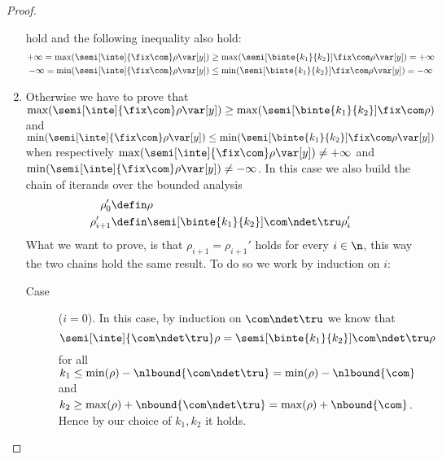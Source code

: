 \begin{proof}
\begin{inductive}
\begin{enumerate}[label=(\roman*)]
      hold and the following inequality also hold:
      \begin{align*}
        +\infty = \max({\semi[\inte]{\fix\com}\rho\var[y]}) & \geq \max({\semi[\binte{k_1}{k_2}]{\fix\com}\rho\var[y]}) = +\infty \\
        -\infty = \min({\semi[\inte]{\fix\com}\rho\var[y]}) & \leq \min({\semi[\binte{k_1}{k_2}]{\fix\com}\rho\var[y]}) = -\infty
      \end{align*}
    \item Otherwise we have to prove that
      \({\max(\semi[\inte]{\fix\com}\rho\var[y])} \geq
      {\max(\semi[\binte{k_1}{k_2}]{\fix\com}\rho)}\) and
      \({\min(\semi[\inte]{\fix\com}\rho\var[y])} \leq
      {\min(\semi[\binte{k_1}{k_2}]{\fix\com}\rho\var[y])}\) when
      respectively
      \({\max(\semi[\inte]{\fix\com}\rho\var[y]) \neq + \infty}\) and
      \({\min(\semi[\inte]{\fix\com}\rho\var[y]) \neq -\infty}\). In
      this case we also build the chain of iterands over the bounded
      analysis
      \begin{align*}
        \rho_0'& \defin \rho \\
        \rho_{i+1}' & \defin \semi[\binte{k_1}{k_2}]{\com\ndet\tru}\rho_i'
      \end{align*}
      What we want to prove, is that \(\rho_{i+1} = \rho_{i+1}'\)
      holds for every \(i\in\n\), this way the two chains hold the
      same result. To do so we work by induction on \(i\):
      \begin{description}
      \item[Case] (\(i=0\)). In this case, by induction on
        \(\com\ndet\tru\) we know that
        \[\semi[\inte]{\com\ndet\tru}\rho =
          \semi[\binte{k_1}{k_2}]{\com\ndet\tru}\rho\] for all
        \(k_1 \leq \min(\rho) - \nlbound{\com\ndet\tru} = \min(\rho) -
        \nlbound{\com}\) and
        \(k_2 \geq \max(\rho) + \nbound{\com\ndet\tru} = \max(\rho) +
        \nbound{\com}\). Hence by our choice of \(k_1, k_2\) it holds.
        

\end{description}
\end{enumerate}
\end{inductive}
\end{proof}
